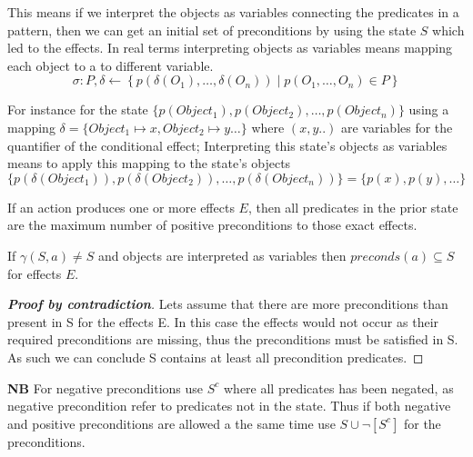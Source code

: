 \documentclass[../Master.tex]{subfiles}
\begin{document}
This means if we interpret the objects as variables connecting the predicates in a pattern, then we can get an initial set of preconditions by using the state $S$ which led to the effects. In real terms interpreting objects as variables means mapping each object 
to a to different variable.
\begin{equation*}
	\sigma : P, \delta \leftarrow \left\{p\left(\delta(O_1),\ldots,\delta(O_n) \right) \mid p(O_1,\ldots,O_n) \in P  \right\}
\end{equation*}



For instance for the state
$\{ p(Object_1), p(Object_2),\ldots,p(Object_n)\}$ using a mapping
$\delta = \{Object_1 \mapsto x, Object_2 \mapsto y \ldots\}$
where $(x, y..)$ are variables for the quantifier of the conditional effect; Interpreting this state's objects as variables means to apply this mapping to the state's objects
\begin{equation*}
\{ p(\delta(Object_1)), p(\delta(Object_2)),\ldots,p(\delta(Object_n))\} = \{ p(x), p(y),\ldots\}
\end{equation*}

\begin{theorem}\label{thm:ca:precondition-state}
If an action produces one or more effects $E$, then all predicates in the prior state are the maximum number of positive preconditions to those exact effects.

If $\gamma (S,a) \neq S$ and objects are interpreted as variables then $preconds(a) \subseteq S$  for effects $E$.

\begin{proof}[\textbf{Proof by contradiction}] Lets assume that there are more preconditions than present in S for the effects E.
	In this case the effects would not occur as their required preconditions are missing, thus the preconditions must be satisfied in S.
	As such we can conclude S contains at least all precondition predicates.    \qedhere
\end{proof}
\end{theorem}

\textbf{NB} For negative preconditions use $S^c$ where all predicates has been negated, as negative precondition refer to predicates not in the state.
Thus if both negative and positive preconditions are allowed a the same time use  $S \cup \neg[S^c] $ for the preconditions.
\end{document}
